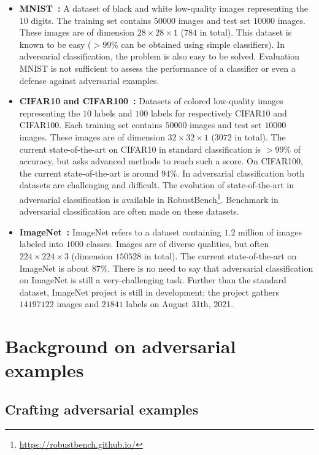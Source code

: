 \begin{itemize}
    \item \textbf{MNIST~\citep{lecun1998mnist}:} A dataset of black and white low-quality images representing the $10$ digits. The training set contains $50000$ images and test set $10000$ images. These images are of dimension $28\times28\times 1$ ($784$ in total). This dataset is known to be easy ($>99\%$ can be obtained using simple classifiers). In adversarial classification, the problem is also easy to be solved. Evaluation MNIST is not sufficient to assess the performance of a classifier or even a defense against adversarial examples.
    \item \textbf{CIFAR10 and CIFAR100~\citep{krizhevsky2009learning}:} Datasets of colored low-quality images representing the $10$ labels and $100$ labels for respectively CIFAR10 and CIFAR100. Each training set contains $50000$ images and test set $10000$ images. These images are of dimension $32\times32\times 1$ ($3072$ in total). The current state-of-the-art on CIFAR10 in standard classification is $>99\%$ of accuracy, but asks advanced methods to reach such a score. On CIFAR100, the current state-of-the-art is around $94\%$. In adversarial classification both datasets are challenging and difficult. The evolution of state-of-the-art in adversarial classification is available in RobustBench\footnote{\url{https://robustbench.github.io/}}. Benchmark in adversarial classification are often made on these datasets.
    \item \textbf{ImageNet~\citep{imagenet_cvpr09}:} ImageNet refers to a dataset containing $1.2$ million of images labeled into $1000$ classes. Images are of diverse qualities, but often $224\times224\times 3$ (dimension $150528$ in total). The current state-of-the-art on ImageNet is about $87\%$. There is no need to say that adversarial classification on ImageNet is still a very-challenging task. Further than the standard dataset, ImageNet project is still in development: the project gathers $14197122$ images and $21841$ labels on August 31th, 2021.   


\end{itemize}
\section{Background on adversarial examples}
\subsection{Crafting adversarial examples}

